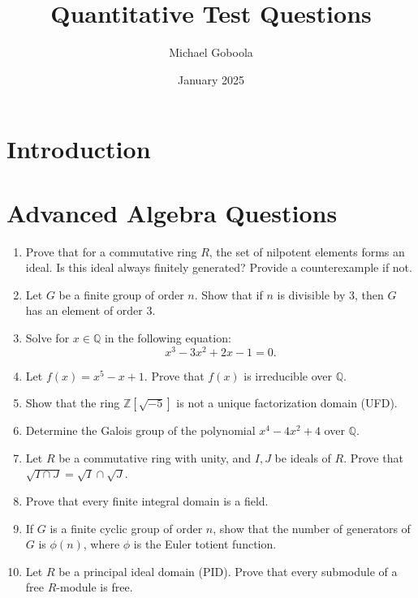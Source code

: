 \documentclass{article}
\title{Quantitative Test Questions}
\author{Michael Goboola}
\date{January 2025}
\begin{document}
\maketitle

\section{Introduction}

\section*{Advanced Algebra Questions}

\begin{enumerate}
    \item Prove that for a commutative ring \( R \), the set of nilpotent elements forms an ideal. Is this ideal always finitely generated? Provide a counterexample if not.

    \item Let \( G \) be a finite group of order \( n \). Show that if \( n \) is divisible by 3, then \( G \) has an element of order 3.

    \item Solve for \( x \in \mathbb{Q} \) in the following equation:
    \[
    x^3 - 3x^2 + 2x - 1 = 0.
    \]

    \item Let \( f(x) = x^5 - x + 1 \). Prove that \( f(x) \) is irreducible over \( \mathbb{Q} \).

    \item Show that the ring \( \mathbb{Z}[\sqrt{-5}] \) is not a unique factorization domain (UFD).

    \item Determine the Galois group of the polynomial \( x^4 - 4x^2 + 4 \) over \( \mathbb{Q} \).

    \item Let \( R \) be a commutative ring with unity, and \( I, J \) be ideals of \( R \). Prove that \( \sqrt{I \cap J} = \sqrt{I} \cap \sqrt{J} \).

    \item Prove that every finite integral domain is a field.

    \item If \( G \) is a finite cyclic group of order \( n \), show that the number of generators of \( G \) is \( \phi(n) \), where \( \phi \) is the Euler totient function.

    \item Let \( R \) be a principal ideal domain (PID). Prove that every submodule of a free \( R \)-module is free.
\end{enumerate}
\end{document}
